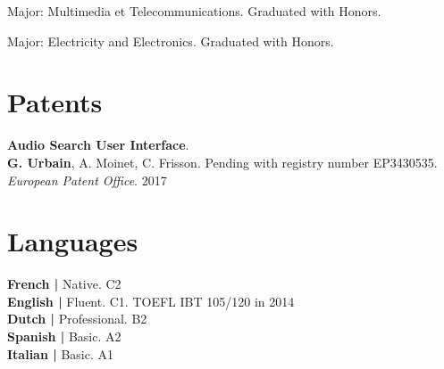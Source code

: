 \documentclass[a4paper]{deedy-resume} %
\begin{document}
{
\vspace{2pt}
Major: Multimedia et Telecommunications. Graduated with Honors.

\vspace{3pt}
Major: Electricity and Electronics. Graduated with Honors.

\pagebreak
\vspace*{0.1pt}

\begin{minipage}[b]{0.55\linewidth}
	
	
	\section{Patents}
	
	\vspace{5pt}
	\textbf{Audio Search User Interface}.\\
	\textbf{G. Urbain}, A. Moinet, C. Frisson. Pending with registry number EP3430535. \textit{European Patent Office}. 2017
	
	\vspace{18pt}
	
\end{minipage}
\hfill
\begin{minipage}[b]{0.42\linewidth}
	
	
	\section{Languages}
	\vspace{5pt}
	\noindent
	\textbf{French  \tabto{1.5cm} | \hspace{2pt}} Native. C2\\
	\textbf{English   \tabto{1.5cm}| \hspace{2pt}}  Fluent. C1. TOEFL IBT 105/120 in 2014\\
	\textbf{Dutch  \tabto{1.5cm} | \hspace{2pt}}  Professional. B2\\
	\textbf{Spanish  \tabto{1.5cm} | \hspace{2pt}} Basic. A2\\
	\textbf{Italian  \tabto{1.5cm}| \hspace{2pt}}  Basic. A1
	

\end{minipage}}
\end{document}
